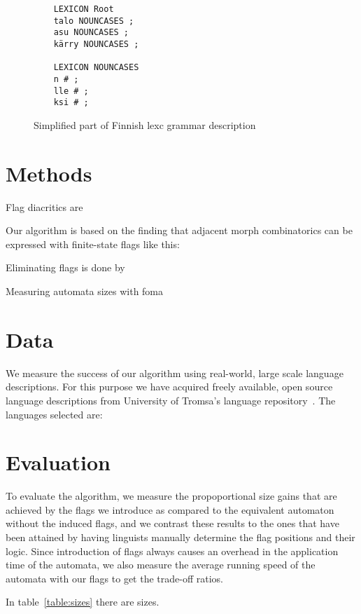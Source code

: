 \documentclass[11pt]{article}
\begin{document}
\begin{figure}
    \centering
    \begin{verbatim}
    LEXICON Root
    talo NOUNCASES ;
    asu NOUNCASES ;
    kärry NOUNCASES ;

    LEXICON NOUNCASES
    n # ;
    lle # ;
    ksi # ;
    \end{verbatim}
    \caption{Simplified part of Finnish lexc grammar description
    \label{fig:lexc-fin}}
\end{figure}

\section{Methods}
\label{sec:methods}

Flag diacritics are

Our algorithm is based on the finding that adjacent morph combinatorics can
be expressed with finite-state flags like this:

Eliminating flags is done by

Measuring automata sizes with foma


\section{Data}
\label{sec:data}

We measure the success of our algorithm using real-world, large scale language
descriptions. For this purpose we have acquired freely available, open source
language descriptions from University of Tromsa's language 
repository~\cite{moshagen2013building}. The languages selected are:

\section{Evaluation}
\label{sec:evaluation}

To evaluate the algorithm, we measure the propoportional size gains that are
achieved by the flags we introduce as compared to the equivalent automaton
without the induced flags, and we contrast these results to the ones that have
been attained by having linguists manually determine the flag positions and
their logic. Since introduction of flags always causes an overhead in the
application time of the automata, we also measure the average running speed
of the automata with our flags to get the trade-off ratios.

In table~\ref{table:sizes} there are sizes.
\end{document}
